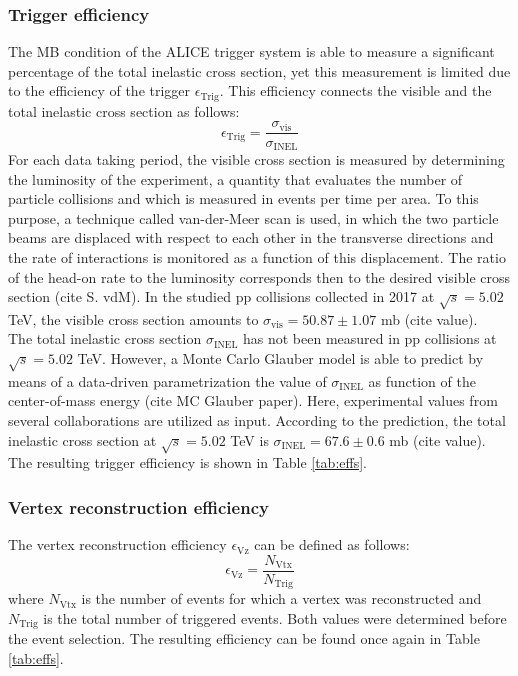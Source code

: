 \documentclass[12pt,a4paper]{report}
\begin{document}
\subsubsection{Trigger efficiency}
The MB condition of the ALICE trigger system is able to measure a significant percentage of the total inelastic cross section, yet this measurement is limited due to the efficiency of the trigger $\epsilon_\text{Trig}$. This efficiency connects the visible and the total inelastic cross section as follows:
\begin{equation}
\epsilon_\text{Trig}  =  \dfrac{\sigma_\text{vis}}{\sigma_\text{INEL}} 
\label{effTrig}
\end{equation}
For each data taking period, the visible cross section is measured by determining the luminosity of the experiment, a quantity that evaluates the number of particle collisions and which is measured in events per time per area. To this purpose, a technique called van-der-Meer scan is used, in which the two particle beams are displaced with respect to each other in the transverse directions and the rate of interactions is monitored as a function of this displacement. The ratio of the head-on rate to the luminosity corresponds then to the desired visible cross section (cite S. vdM). In the studied pp collisions collected in 2017 at $\sqrt{s} = 5.02$ TeV, the visible cross section amounts to $\sigma_\text{vis} = 50.87 \pm 1.07$ mb (cite value). \\
The total inelastic cross section $\sigma_\text{INEL}$ has not been measured in pp collisions at $\sqrt{s} = 5.02$ TeV. However, a Monte Carlo Glauber model is able to predict by means of a data-driven parametrization the value of $\sigma_\text{INEL}$ as function of the center-of-mass energy 	(cite MC Glauber paper). Here, experimental values from several collaborations are utilized as input. According to the prediction, the total inelastic cross section at $\sqrt{s} = 5.02$ TeV is $\sigma_\text{INEL} = 67.6 \pm 0.6$ mb (cite value). The resulting trigger efficiency is shown in Table \ref{tab:effs}.
\subsubsection{Vertex reconstruction efficiency}
The vertex reconstruction efficiency $\epsilon_\text{Vz}$ can be defined as follows:
\begin{equation}
\epsilon_\text{Vz} = \dfrac{N_\text{Vtx}}{N_\text{Trig}} 
\end{equation}
where $N_\text{Vtx}$ is the number of events for which a vertex was reconstructed and $N_\text{Trig}$ is the total number of triggered events. Both values were determined before the event selection. The resulting efficiency can be found once again in Table \ref{tab:effs}.
\end{document}
